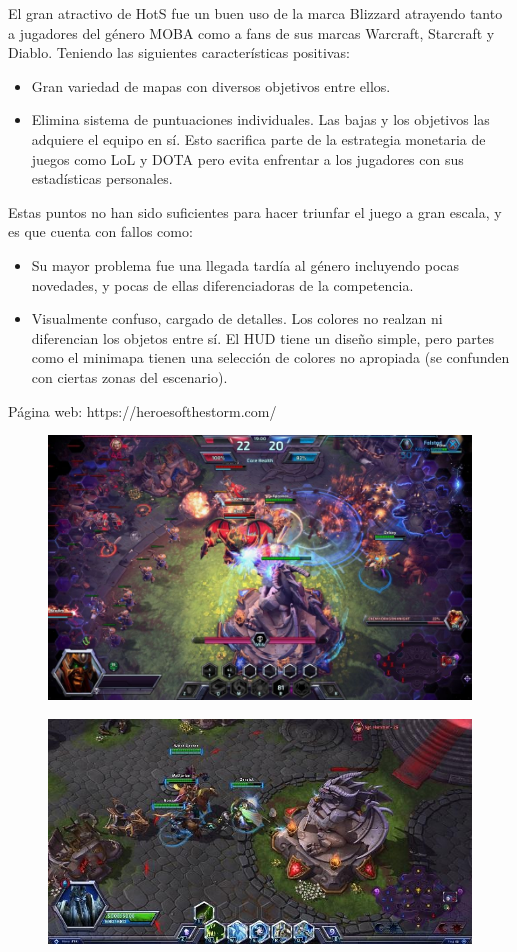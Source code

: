 \vspace{\baselineskip}

El gran atractivo de HotS fue un buen uso de la marca Blizzard atrayendo tanto a jugadores del género MOBA como a fans de sus marcas Warcraft, Starcraft y Diablo. Teniendo las siguientes características positivas:

\begin{itemize}
    \item Gran variedad de mapas con diversos objetivos entre ellos.
    \item Elimina sistema de puntuaciones individuales. Las bajas y los objetivos las adquiere el equipo en sí. Esto sacrifica parte de la estrategia monetaria de juegos como LoL y DOTA pero evita enfrentar a los jugadores con sus estadísticas personales.
\end{itemize}

Estas puntos no han sido suficientes para hacer triunfar el juego a gran escala, y es que cuenta con fallos como:

\begin{itemize}
    \item Su mayor problema fue una llegada tardía al género incluyendo pocas novedades, y pocas de ellas diferenciadoras de la competencia.
    \item Visualmente confuso, cargado de detalles. Los colores no realzan ni diferencian los objetos entre sí. El HUD tiene un diseño simple, pero partes como el minimapa tienen una selección de colores no apropiada (se confunden con ciertas zonas del escenario).
\end{itemize}

Página web: https://heroesofthestorm.com/

\begin{figure}[H]
    \centering
    \includegraphics[width=0.95\columnwidth]{images/hots1.jpg}    
\end{figure}

\begin{figure}[H]
    \centering
    \includegraphics[width=0.95\columnwidth]{images/hots2.jpg}    
\end{figure}